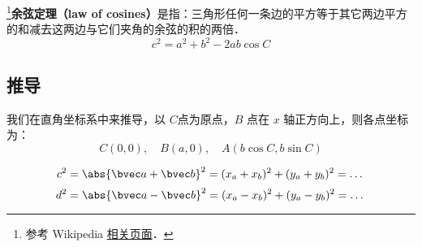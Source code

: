 
\begin{issues}
\issueDraft
\end{issues}

\footnote{参考 Wikipedia \href{https://en.wikipedia.org/wiki/Law_of_cosines}{相关页面}．}\textbf{余弦定理（law of cosines）}是指：三角形任何一条边的平方等于其它两边平方的和减去这两边与它们夹角的余弦的积的两倍．
\begin{equation}\label{CosThe_eq1}
c^2=a^2 + b^2 - 2ab\cos C
\end{equation}



\subsection{推导}
我们在直角坐标系中来推导，以 $C$点为原点，$B$ 点在 $x$ 轴正方向上，则各点坐标为：
\begin{equation}
C(0,0),\quad B(a,0),\quad A(b\cos C,b\sin C)
\end{equation}

\begin{equation}
c^2 = \abs{\bvec a + \bvec b}^2 = (x_a + x_b)^2 + (y_a + y_b)^2 = \dots
\end{equation}
\begin{equation}
d^2 = \abs{\bvec a - \bvec b}^2 = (x_a - x_b)^2 + (y_a - y_b)^2 = \dots
\end{equation}
